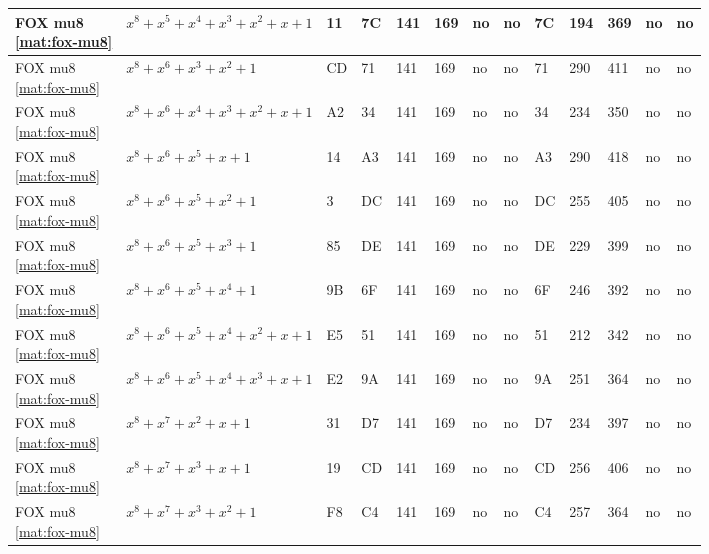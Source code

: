 \begin{tiny}
\begin{longtable}{|l|l|l|l|l|l|l|l|l|l|l|l|l|}
\shortstack{FOX mu8 \\ \eqref{mat:fox-mu8}} & $x^8 + x^5 + x^4 + x^3 + x^2 + x + 1$ & 11 & 7C & 141 & 169 & no & no & 7C & 194 & 369 & no & no \\ \hline
\shortstack{FOX mu8 \\ \eqref{mat:fox-mu8}} & $x^8 + x^6 + x^3 + x^2 + 1$ & CD & 71 & 141 & 169 & no & no & 71 & 290 & 411 & no & no \\ \hline
\shortstack{FOX mu8 \\ \eqref{mat:fox-mu8}} & $x^8 + x^6 + x^4 + x^3 + x^2 + x + 1$ & A2 & 34 & 141 & 169 & no & no & 34 & 234 & 350 & no & no \\ \hline
\shortstack{FOX mu8 \\ \eqref{mat:fox-mu8}} & $x^8 + x^6 + x^5 + x + 1$ & 14 & A3 & 141 & 169 & no & no & A3 & 290 & 418 & no & no \\ \hline
\shortstack{FOX mu8 \\ \eqref{mat:fox-mu8}} & $x^8 + x^6 + x^5 + x^2 + 1$ & 3 & DC & 141 & 169 & no & no & DC & 255 & 405 & no & no \\ \hline
\shortstack{FOX mu8 \\ \eqref{mat:fox-mu8}} & $x^8 + x^6 + x^5 + x^3 + 1$ & 85 & DE & 141 & 169 & no & no & DE & 229 & 399 & no & no \\ \hline
\shortstack{FOX mu8 \\ \eqref{mat:fox-mu8}} & $x^8 + x^6 + x^5 + x^4 + 1$ & 9B & 6F & 141 & 169 & no & no & 6F & 246 & 392 & no & no \\ \hline
\shortstack{FOX mu8 \\ \eqref{mat:fox-mu8}} & $x^8 + x^6 + x^5 + x^4 + x^2 + x + 1$ & E5 & 51 & 141 & 169 & no & no & 51 & 212 & 342 & no & no \\ \hline
\shortstack{FOX mu8 \\ \eqref{mat:fox-mu8}} & $x^8 + x^6 + x^5 + x^4 + x^3 + x + 1$ & E2 & 9A & 141 & 169 & no & no & 9A & 251 & 364 & no & no \\ \hline
\shortstack{FOX mu8 \\ \eqref{mat:fox-mu8}} & $x^8 + x^7 + x^2 + x + 1$ & 31 & D7 & 141 & 169 & no & no & D7 & 234 & 397 & no & no \\ \hline
\shortstack{FOX mu8 \\ \eqref{mat:fox-mu8}} & $x^8 + x^7 + x^3 + x + 1$ & 19 & CD & 141 & 169 & no & no & CD & 256 & 406 & no & no \\ \hline
\shortstack{FOX mu8 \\ \eqref{mat:fox-mu8}} & $x^8 + x^7 + x^3 + x^2 + 1$ & F8 & C4 & 141 & 169 & no & no & C4 & 257 & 364 & no & no \\ \hline

\end{longtable}
\end{tiny}
